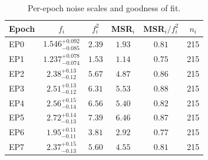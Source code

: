 \begin{table}
\caption{Per-epoch noise scales and goodness of fit.}
\label{tab:noise}
\centering
\begin{tabular}{lccccc}
\hline\hline
Epoch & $f_{i}$ & $f_{i}^{2}$ & MSR$_{i}$ & MSR$_{i}/f_{i}^{2}$ & $n_{i}$ \\
\hline
EP0 & $1.546^{+0.092}_{-0.085}$ & $2.39$ & $1.93$ & $0.81$ & 215 \\
EP1 & $1.237^{+0.078}_{-0.074}$ & $1.53$ & $1.14$ & $0.75$ & 215 \\
EP2 & $2.38^{+0.13}_{-0.12}$ & $5.67$ & $4.87$ & $0.86$ & 215 \\
EP3 & $2.51^{+0.13}_{-0.12}$ & $6.31$ & $5.53$ & $0.88$ & 215 \\
EP4 & $2.56^{+0.15}_{-0.14}$ & $6.56$ & $5.40$ & $0.82$ & 215 \\
EP5 & $2.72^{+0.14}_{-0.13}$ & $7.39$ & $6.46$ & $0.87$ & 215 \\
EP6 & $1.95^{+0.11}_{-0.11}$ & $3.81$ & $2.92$ & $0.77$ & 215 \\
EP7 & $2.37^{+0.15}_{-0.13}$ & $5.60$ & $4.55$ & $0.81$ & 215 \\
\hline
\end{tabular}
\end{table}
